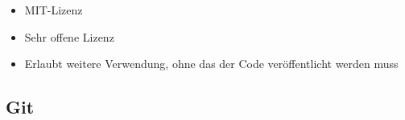 \documentclass[accentcolor=tud1b,colorbacktitle,landscape,german,presentation]{tudbeamer}
\newcommand{\ftitle}{

	\frametitle{\insertsectionhead \\ {\small \insertsubsectionhead}}
}
\begin{document}
\begin{frame}
	\ftitle
	\begin{minipage}[t]{0.5\textwidth}
		\begin{itemize}
			\item MIT-Lizenz\pause
			\item Sehr offene Lizenz\pause
			\item Erlaubt weitere Verwendung, ohne das der Code veröffentlicht werden muss
		\end{itemize}
	\end{minipage}
\end{frame}

\subsection{Git}
\end{document}
